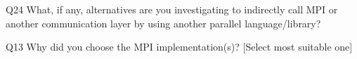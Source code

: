 \begin{description}%
\item{Q24} What, if any, alternatives are you investigating to indirectly call MPI or another communication layer by using another parallel language/library?%
\item{Q13} Why did you choose the MPI implementation(s)? [Select most suitable one]%
\end{description}%
